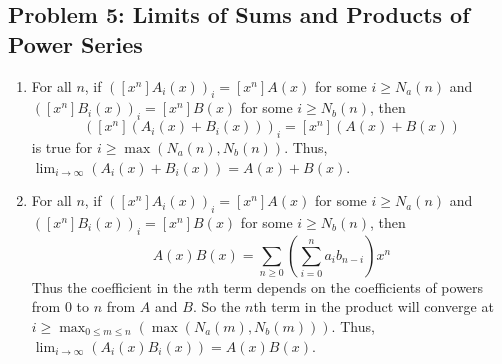 \documentclass{report}
\begin{document}
\subsection*{Problem 5: Limits of Sums and Products of Power Series}
\begin{enumerate}
    \item For all $n$, if $([x^n]A_i(x))_i = [x^n]A(x)$ for some $i \geq N_a(n)$ and 
    $([x^n]B_i(x))_i = [x^n]B(x)$ for some $i \geq N_b(n)$, then 
    \[
        ([x^n](A_i(x) + B_i(x)))_i = [x^n](A(x)+B(x))
    \] 
    is true for $i \geq \max(N_a(n), N_b(n))$. 
    Thus, $\lim_{i \to \infty}(A_i(x) +B_i(x)) = A(x) + B(x)$.
    \item For all $n$, if $([x^n]A_i(x))_i = [x^n]A(x)$ for some $i \geq N_a(n)$ and 
    $([x^n]B_i(x))_i = [x^n]B(x)$ for some $i \geq N_b(n)$, then 
    \[
        A(x)B(x) = \sum_{n \geq 0} \left(\sum_{i=0}^n a_i b_{n-i}\right)x^n
    \]
    Thus the coefficient in the $n$th term depends on the coefficients of
    powers from $0$ to $n$ from $A$ and $B$. So the $n$th term in the product will converge
    at $i \geq \max_{0 \leq m \leq n}(\max(N_a(m), N_b(m)))$.
    Thus, $\lim_{i \to \infty}(A_i(x)B_i(x)) = A(x)B(x)$.
\end{enumerate}
\end{document}
